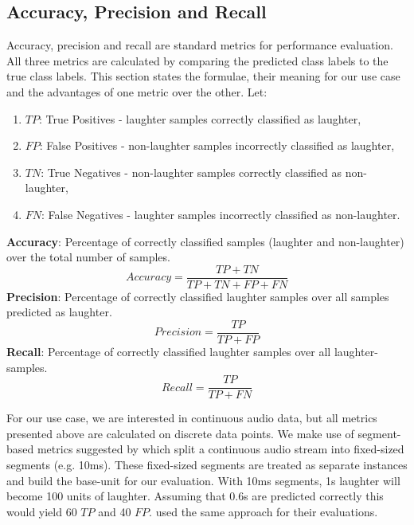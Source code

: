 \documentclass[bsc,frontabs,parskip,deptreport]{infthesis}
\begin{document}
\subsection{Accuracy, Precision and Recall} \label{sec:acc-prec-rec}
Accuracy, precision and recall are standard metrics for performance evaluation.
All three metrics are calculated by comparing the predicted class labels to the true class labels.
This section states the formulae, their meaning for our use case and the advantages of one metric over the other.
Let:
\begin{enumerate}
    \item $TP$: True Positives - laughter samples correctly classified as laughter,
    \item $FP$: False Positives - non-laughter samples incorrectly classified as laughter,
    \item $TN$: True Negatives - non-laughter samples correctly classified as non-laughter,
    \item $FN$: False Negatives - laughter samples incorrectly classified as non-laughter.
\end{enumerate}
\textbf{Accuracy}: Percentage of correctly classified samples (laughter and non-laughter) over the total number of samples.
$$Accuracy = \frac{TP+TN}{TP+TN+FP+FN}$$
\textbf{Precision}: Percentage of correctly classified laughter samples over all samples predicted as laughter.
$$Precision = \frac{TP}{TP+FP}$$
\textbf{Recall}: Percentage of correctly classified laughter samples over all laughter-samples.
$$Recall = \frac{TP}{TP+FN}$$

For our use case, we are interested in continuous audio data, but all metrics presented above are calculated on discrete data points. We make use of segment-based metrics suggested by \citet{mesaros2016metrics} which split a continuous audio stream into fixed-sized segments (e.g. 10ms). These fixed-sized segments are treated as separate instances and build the base-unit for our evaluation. With 10ms segments, 1s laughter will become 100 units of laughter. Assuming that 0.6s are predicted correctly this would yield 60 $TP$ and 40 $FP$.
\citet{gillick2021robust} used the same approach for their evaluations.
\end{document}
